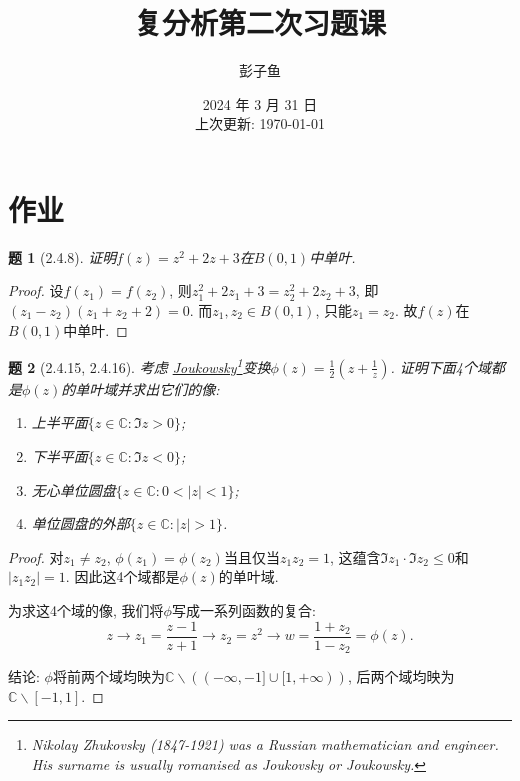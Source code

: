 \documentclass{article}[a4paper, 12pt]
\newtheorem{problem}{题}
\begin{document}
\title{复分析第二次习题课}
\author{彭子鱼}
\date{2024 年 3 月 31 日\\上次更新: \today}

\maketitle

\section{作业}

\begin{problem}[2.4.8]
证明\(f(z)=z^2+2z+3\)在\(B(0,1)\)中单叶.
\end{problem}

\begin{proof}
  设\(f(z_1)=f(z_2)\), 则\(z_1^2+2z_1+3=z_2^2+2z_2+3\), 即\((z_1-z_2)(z_1+z_2+2)=0\). 而\(z_1,z_2\in B(0,1)\), 只能\(z_1=z_2\). 故\(f(z)\)在\(B(0,1)\)中单叶.
\end{proof}

\begin{problem}[2.4.15, 2.4.16]
  考虑 \href{https://en.wikipedia.org/wiki/Joukowsky_transform}{Joukowsky\footnote{Nikolay Zhukovsky (1847-1921) was a Russian mathematician and engineer. His surname is usually romanised as Joukovsky or Joukowsky.}变换}\(\phi(z)=\frac12\left(z+\frac1z\right)\). 证明下面4个域都是\(\phi(z)\)的单叶域并求出它们的像:
  \begin{enumerate}
    \item 上半平面\(\{z\in\mathbb{C}:\Im z>0\}\);
    \item 下半平面\(\{z\in\mathbb{C}:\Im z<0\}\);
    \item 无心单位圆盘\(\{z\in\mathbb{C}:0<|z|<1\}\);
    \item 单位圆盘的外部\(\{z\in\mathbb{C}:|z|>1\}\).
  \end{enumerate}
\end{problem}

\begin{proof}
  对\(z_1\ne z_2\), \(\phi(z_1)=\phi(z_2)\)当且仅当\(z_1z_2=1\), 这蕴含\(\Im z_1\cdot\Im z_2\le0\)和\(|z_1z_2|=1\). 因此这4个域都是\(\phi(z)\)的单叶域. 

  为求这4个域的像, 我们将\(\phi\)写成一系列函数的复合:
  \[z\longrightarrow z_1=\frac{z-1}{z+1}\longrightarrow z_2=z^2\longrightarrow w=\frac{1+z_2}{1-z_2}=\phi(z).\]

  结论: \(\phi\)将前两个域均映为\(\mathbb{C}\backslash((-\infty,-1]\cup[1,+\infty))\), 后两个域均映为\(\mathbb{C}\backslash[-1,1]\).
\end{proof}
\end{document}
